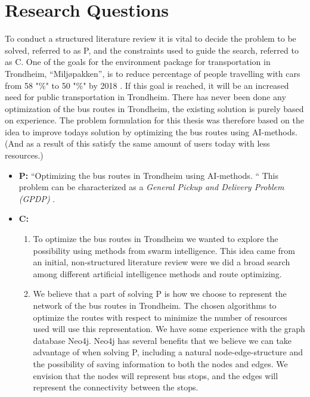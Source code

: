 \section{Research Questions}
To conduct a structured literature review it is vital to decide the problem to be solved, referred to as P, and the constraints used to guide the search, referred to as C.
\newline
\newline
One of the goals for the environment package for transportation in Trondheim, ``Miljøpakken'', is to reduce percentage of people travelling with cars from 58 "\%" to 50 "\%" by 2018 \cite{website:miljopakken}. If this goal is reached, it will be an increased need for public transportation in Trondheim. There has never been done any optimization of the bus routes in Trondheim, the existing solution is purely based on experience. The problem formulation for this thesis was therefore based on the idea to improve todays solution by optimizing the bus routes using AI-methods. (And as a result of this satisfy the same amount of users today with less resources.)

\begin{itemize}
\item \textbf{P:} “Optimizing the bus routes in Trondheim using AI-methods. “ This problem can be characterized as a \textit{General Pickup and Delivery Problem (GPDP)} \cite[p.22-25]{vehiclerouting}.  
\item \textbf{C:} 
    \begin{enumerate}
        \item To optimize the bus routes in Trondheim we wanted to explore the possibility using methods from swarm intelligence. This idea came from an initial, non-structured literature review were we did a broad search among different artificial intelligence methods and route optimizing. %
        \item We believe that a part of solving P is how we choose to represent the network of the bus routes in Trondheim. The chosen algorithms to optimize the routes with respect to minimize the number of resources used will use this representation. We have some experience with the graph database Neo4j. Neo4j has several benefits that we believe we can take advantage of when solving P, including a natural node-edge-structure and the possibility of saving information to both the nodes and edges. We envision that the nodes will represent bus stops, and the edges will represent the connectivity between the stops. 
    \end{enumerate}
\end{itemize}

